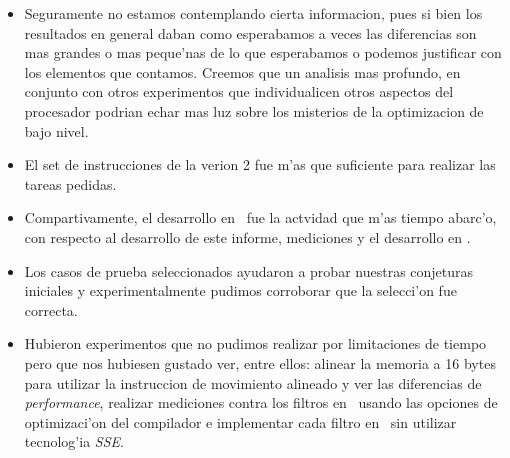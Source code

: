 \begin{itemize}
\item Seguramente no estamos contemplando cierta informacion, pues si bien los resultados en general daban como esperabamos a veces las diferencias son mas grandes o mas peque'nas de lo que esperabamos o podemos justificar con los elementos que contamos. Creemos que un analisis mas profundo, en conjunto con otros experimentos que individualicen otros aspectos del procesador podrian echar mas luz sobre los misterios de la optimizacion de bajo nivel. 

\item El set de instrucciones de la verion 2 fue m'as que suficiente para realizar las tareas pedidas.

\item Compartivamente, el desarrollo en \ass \ fue la actvidad que m'as tiempo abarc'o, con respecto al desarrollo de este informe, mediciones y
el desarrollo en \C.

\item Los casos de prueba seleccionados ayudaron a probar nuestras conjeturas iniciales y experimentalmente pudimos corroborar 
que la selecci'on fue correcta.

\item Hubieron experimentos que no pudimos realizar por limitaciones de tiempo pero que nos hubiesen gustado ver, entre ellos: alinear la memoria a 16 bytes para utilizar la instruccion de movimiento alineado y ver las diferencias de \textit{performance}, realizar mediciones contra los filtros en \C \ usando las opciones de optimizaci'on del compilador e implementar cada filtro en \ass \ sin utilizar tecnolog'ia \textit{SSE}.  
\end{itemize}